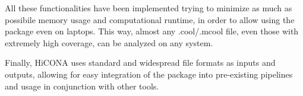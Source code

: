 All these functionalities have been implemented trying to minimize as much as possibile memory usage and computational runtime, in order to allow using the package even on laptops. This way, almost any .cool/.mcool file, even those with extremely high coverage, can be analyzed on any system.

Finally, HiCONA uses standard and widespread file formats as inputs and outputs, allowing for easy integration of the package into pre-existing pipelines and usage in conjunction with other tools.

